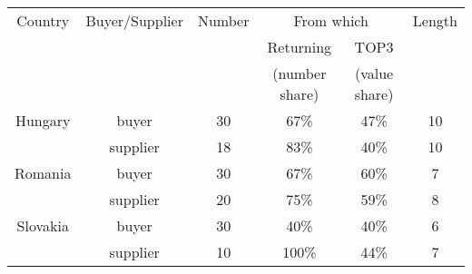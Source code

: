 
\begin{tabular}{cccccc}
\toprule
    Country & Buyer/Supplier & Number & \multicolumn{2}{c}{From which} & Length \\
     & & & Returning & TOP3 & \\
     &&&(number share) & (value share) & \\
     \midrule
     Hungary  & buyer & 30 & 67\% & 47\% &10 \\
              & supplier & 18 & 83\% & 40\% &10 \\ 
     \addlinespace[2ex]
     Romania  & buyer & 30 & 67\% & 60\% &7 \\
              & supplier & 20 & 75\% & 59\% &8 \\
     \addlinespace[2ex]
     Slovakia & buyer & 30 & 40\% & 40\% &6 \\
              & supplier & 10 & 100\% & 44\% &7 \\ 
              \bottomrule
\end{tabular}
